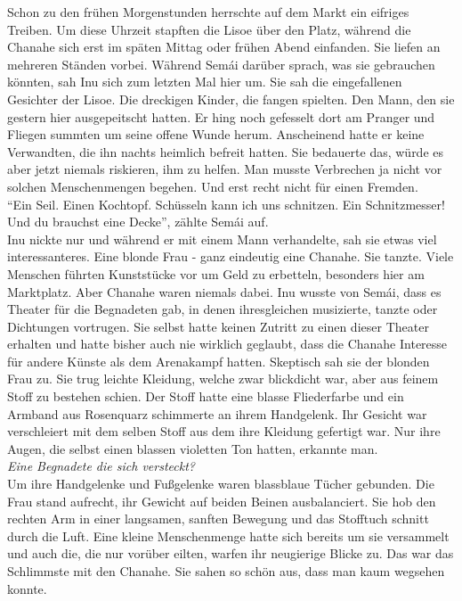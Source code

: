 Schon zu den frühen Morgenstunden herrschte auf dem Markt ein eifriges Treiben. Um diese Uhrzeit 
stapften die Lisoe über den Platz, während die Chanahe sich erst im späten Mittag oder frühen Abend 
einfanden. Sie liefen an mehreren Ständen vorbei. Während Semái darüber sprach, was sie gebrauchen 
könnten, sah Inu sich zum letzten Mal hier um. Sie sah die eingefallenen Gesichter der Lisoe. Die 
dreckigen Kinder, die fangen spielten. Den Mann, den sie gestern hier ausgepeitscht hatten. Er hing 
noch gefesselt dort am Pranger und Fliegen summten um seine offene Wunde herum. Anscheinend hatte 
er keine Verwandten, die ihn nachts heimlich befreit hatten. Sie bedauerte das, würde es aber jetzt 
niemals riskieren, ihm zu helfen. Man musste Verbrechen ja nicht vor solchen Menschenmengen 
begehen. Und erst recht nicht für einen Fremden. \\
``Ein Seil. Einen Kochtopf. Schüsseln kann ich uns schnitzen. Ein Schnitzmesser! Und du brauchst 
eine Decke'', zählte Semái auf.\\
Inu nickte nur und während er mit einem Mann verhandelte, sah sie etwas viel interessanteres. Eine 
blonde Frau - ganz eindeutig eine Chanahe. Sie tanzte. Viele Menschen führten Kunststücke vor um 
Geld zu erbetteln, besonders hier am Marktplatz. Aber Chanahe waren niemals dabei. Inu wusste von 
Semái, dass es Theater für die Begnadeten gab, in denen ihresgleichen musizierte, tanzte oder 
Dichtungen vortrugen. Sie selbst hatte keinen Zutritt zu einen dieser Theater erhalten und hatte 
bisher auch nie wirklich geglaubt, dass die Chanahe Interesse für andere Künste als dem Arenakampf 
hatten. Skeptisch sah sie der blonden Frau zu. Sie trug leichte Kleidung, welche zwar blickdicht 
war, aber aus feinem Stoff zu bestehen schien. Der Stoff hatte eine blasse Fliederfarbe und ein 
Armband aus Rosenquarz schimmerte an ihrem Handgelenk. Ihr Gesicht war verschleiert mit dem selben 
Stoff aus dem ihre Kleidung gefertigt war. Nur ihre Augen, die selbst einen blassen violetten Ton 
hatten, erkannte man. \\
\textit{Eine Begnadete die sich versteckt?}\\
Um ihre Handgelenke und Fußgelenke waren blassblaue Tücher gebunden. Die Frau stand aufrecht, ihr 
Gewicht auf beiden Beinen ausbalanciert. Sie hob den rechten Arm in einer langsamen, sanften 
Bewegung und das Stofftuch schnitt durch die Luft. Eine kleine Menschenmenge hatte sich bereits um 
sie versammelt und auch die, die nur vorüber eilten, warfen ihr neugierige Blicke zu. 
Das war das Schlimmste mit den Chanahe. Sie sahen so schön aus, dass man kaum wegsehen konnte. 

